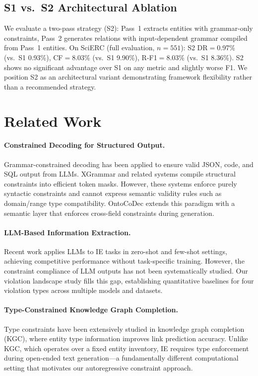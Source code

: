 \documentclass[11pt,a4paper]{article}
\newcommand{\sys}{OntoCoDec}
\begin{document}
\subsection{S1 vs.\ S2 Architectural Ablation}

We evaluate a two-pass strategy (S2): Pass~1 extracts entities with grammar-only constraints, Pass~2 generates relations with input-dependent grammar compiled from Pass~1 entities.
On SciERC (full evaluation, $n=551$): S2 DR$=$0.97\% (vs.\ S1 0.93\%), CF$=$8.03\% (vs.\ S1 9.90\%), R-F1$=$8.03\% (vs.\ S1 8.36\%).
S2 shows no significant advantage over S1 on any metric and slightly worse F1.
We position S2 as an architectural variant demonstrating framework flexibility rather than a recommended strategy.

\section{Related Work}
\label{sec:related}

\paragraph{Constrained Decoding for Structured Output.}
Grammar-constrained decoding has been applied to ensure valid JSON, code, and SQL output from LLMs.
XGrammar and related systems compile structural constraints into efficient token masks.
However, these systems enforce purely syntactic constraints and cannot express semantic validity rules such as domain/range type compatibility.
\sys{} extends this paradigm with a semantic layer that enforces cross-field constraints during generation.

\paragraph{LLM-Based Information Extraction.}
Recent work applies LLMs to IE tasks in zero-shot and few-shot settings, achieving competitive performance without task-specific training.
However, the constraint compliance of LLM outputs has not been systematically studied.
Our violation landscape study fills this gap, establishing quantitative baselines for four violation types across multiple models and datasets.

\paragraph{Type-Constrained Knowledge Graph Completion.}
Type constraints have been extensively studied in knowledge graph completion (KGC), where entity type information improves link prediction accuracy.
Unlike KGC, which operates over a fixed entity inventory, IE requires type enforcement during open-ended text generation---a fundamentally different computational setting that motivates our autoregressive constraint approach.
\end{document}
